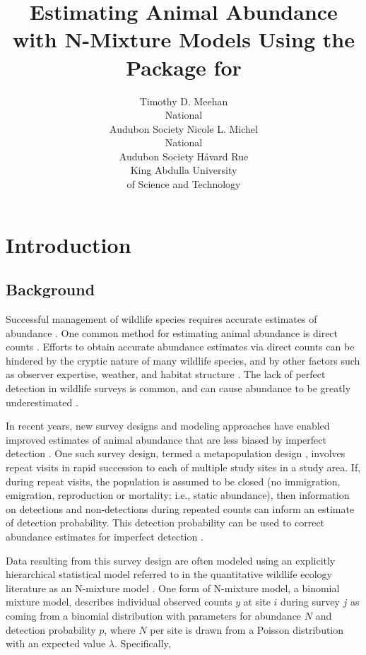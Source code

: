 \documentclass[codesnippet]{jss}
\author{Timothy D. Meehan\\National\\Audubon Society \And
	Nicole L. Michel\\National\\Audubon Society \And
	H{\aa}vard Rue\\King Abdulla University\\of Science and Technology}
\title{Estimating Animal Abundance with N-Mixture Models Using the 
\pkg{R-INLA} Package for \proglang{R}}
\begin{document}
	
\section[Introduction]{Introduction}
\subsection[Background]{Background}
Successful management of wildlife species requires accurate estimates of 
abundance  
\citep{Yoccoz_Nichols_Boulinier_2001}. One common method for estimating 
animal abundance is direct counts 
\citep{Pollock_Nichols_Simons_Farnsworth_Bailey_Sauer_2002}. Efforts to 
obtain accurate abundance estimates via direct counts can be hindered by the 
cryptic nature of many wildlife species, and by other factors such as 
observer expertise, weather, and habitat structure 
\citep{Denes_Silveira_Beissinger_2015}. The lack of perfect detection in 
wildlife surveys is common, and can cause abundance to be greatly 
underestimated  
\citep{Wenger_Freeman_2008, Joseph_Elkin_Martin_Possingham_2009}.

In recent years, new survey designs and modeling approaches have enabled improved estimates of animal abundance that are less biased by imperfect detection \citep{Denes_Silveira_Beissinger_2015}. One such survey design, termed a metapopulation design \citep{Kery_Royle_2010}, involves repeat visits in rapid succession to each of multiple study sites in a study area. If, during repeat visits, the population is assumed to be closed (no immigration, emigration, reproduction or mortality; i.e., static abundance), then information on detections and non-detections during repeated counts can inform an estimate of detection probability. This detection probability can be used to correct abundance estimates for imperfect detection \citep{Royle_2004}.

Data resulting from this survey design are often modeled using an explicitly 
hierarchical statistical model referred to in the quantitative wildlife 
ecology literature as an N-mixture model  
\citep{Royle_Nichols_2003, Dodd_Dorazio_2004, Royle_2004, 
Kery_Royle_Schmid_2005}. One form of N-mixture model, a binomial mixture 
model, describes individual observed counts $y$ at site $i$ during survey 
$j$ as coming from a binomial distribution with parameters for abundance $N$ 
and detection probability $p$, where $N$ per site is drawn from a Poisson 
distribution with an expected value $\lambda$. Specifically,
\end{document}
